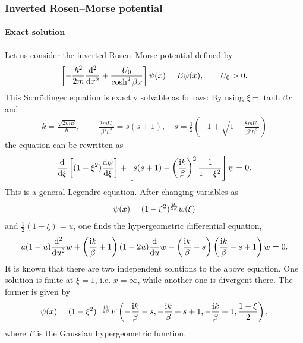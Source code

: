 \subsubsection{Inverted Rosen--Morse potential}\label{src:2503_18741:sec:rm}
\paragraph{Exact solution}
Let us consider the inverted Rosen--Morse potential defined by
\begin{align}
    \left[-\frac{\hbar^2}{2m} \frac{\mathrm{d}^2}{\mathrm{d} x^2} + \frac{U_{0}}{\cosh^2 \beta x}\right] \psi(x)
    = E \psi(x) ,
    \qquad U_{0}>0.
\end{align}
This Schr\"odinger equation is exactly solvable as follows:
By using $\xi = \tanh \beta x$ and
\begin{align}
    k = \frac{\sqrt{2mE}}{\hbar}, \quad
    -\frac{2mU_{0}}{\beta^2\hbar^2} = s(s+1), \quad
    s=\frac{1}{2}\left( -1+\sqrt{1-\frac{8mU_{0}}{\beta^2 \hbar^2}} \right)
\end{align}
the equation can be rewritten as
\begin{align}
    \frac{\mathrm{d}}{\mathrm{d} \xi}\left[ (1-\xi^2) \frac{\mathrm{d} \psi}{\mathrm{d} \xi} \right] +
    \left[ s(s+1) - \left(\frac{\mathrm{i} k}{\beta}\right)^{2} \frac{1}{1-\xi^2} \right]\psi = 0 .
\end{align}
This is a general Legendre equation.
After changing variables as
\begin{align}
    \psi(x) = (1-\xi^2)^{\frac{\mathrm{i} k}{2\beta}} w(\xi)
\end{align} 
and $\frac{1}{2}(1-\xi)=u$, one finds the hypergeometric differential equation,
\begin{align}
    u(1-u)\frac{\mathrm{d}^2}{\mathrm{d} u^2}w + \left( \frac{\mathrm{i} k}{\beta} + 1 \right)(1-2u)\frac{\mathrm{d}}{\mathrm{d} u}w
    - \left( \frac{\mathrm{i} k}{\beta} - s \right) \left( \frac{\mathrm{i} k}{\beta} + s + 1 \right)w = 0 .
\end{align}
It is known that there are two independent solutions to the above equation.
One solution is finite at $\xi=1$, i.e. $x=\infty$, while another one is divergent there.
The former is given by
\begin{align}
    \psi(x) = 
    (1-\xi^2)^{-\frac{\mathrm{i} k}{2\beta}}
    F\left( -\frac{\mathrm{i} k}{\beta}-s, -\frac{\mathrm{i} k}{\beta}+s+1, -\frac{\mathrm{i} k}{\beta}+1, \frac{1-\xi}{2} \right) ,
 \label{src:2503_18741:eq:rm_sol}
\end{align}
where $F$ is the Gaussian hypergeometric function.
